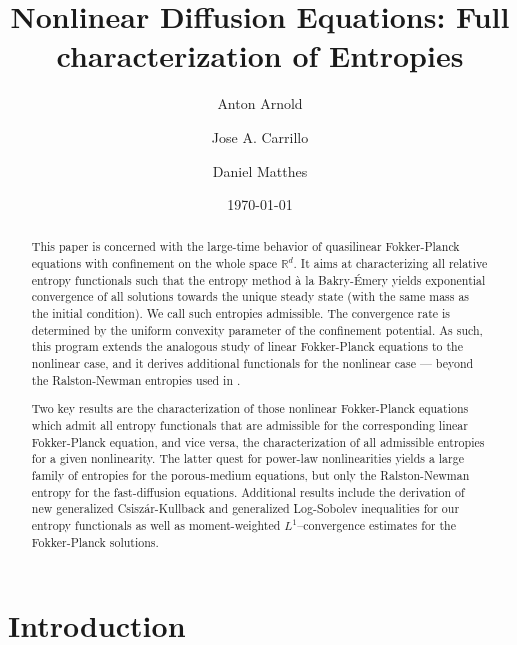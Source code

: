 \documentclass[reqno]{amsart}
\title[Nonlinear Diffusion Equations: Full characterization of Entropies]{Nonlinear Diffusion Equations: Full characterization of Entropies}
\author{Anton Arnold}
\author{Jose A. Carrillo}
\author{Daniel Matthes}
\newcommand{\R}{\mathbb{R}}
\begin{document}
\date{\today}
\begin{abstract}
This paper is concerned with the large-time behavior of quasilinear Fokker-Planck equations with confinement on the whole space $\R^d$. It aims at characterizing all relative entropy functionals such that the entropy method \`a la Bakry-\'Emery yields exponential convergence of all solutions towards the unique steady state (with the same mass as the initial condition). 
We call such entropies admissible. 
The convergence rate is determined by the uniform convexity parameter of the confinement potential. As such, this program extends the analogous study of linear Fokker-Planck equations \cite{BaEm85, AMTU} to the nonlinear case, and it derives additional functionals for the nonlinear case --- beyond the Ralston-Newman entropies used in \cite{CJMTU}. 

Two key results are the characterization of those nonlinear Fokker-Planck equations which admit all entropy functionals that are admissible for the corresponding linear Fokker-Planck equation, and vice versa, the characterization of all admissible entropies for a given nonlinearity. The latter quest for power-law nonlinearities yields a large family of entropies for the porous-medium equations, but only the Ralston-Newman entropy for the fast-diffusion equations. Additional results include the derivation of new generalized Csisz\'ar-Kullback and generalized Log-Sobolev inequalities for our entropy functionals as well as moment-weighted $L^1$--convergence estimates for the Fokker-Planck solutions.
\end{abstract}

\maketitle

\section{Introduction}
\end{document}

